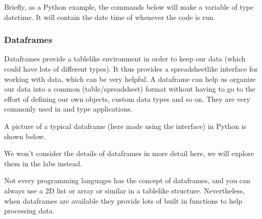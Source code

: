 \documentclass[letterpaper,10pt,british]{sphinxmanual}
\let\sphinxpxdimen\pdfpxdimen\else\newdimen\sphinxpxdimen
\begin{document}
\sphinxAtStartPar
Briefly, as a Python example, the commands below will make a variable  of type datetime. It will contain the date time of whenever the code is run.

\begin{sphinxVerbatim}[commandchars=\\\{\}]
  
\end{sphinxVerbatim}

\sphinxstepscope


\subsubsection{Dataframes}
\label{\detokenize{chapters/programming_fundamentals/dataframes:dataframes}}\label{\detokenize{chapters/programming_fundamentals/dataframes::doc}}
\sphinxAtStartPar
Dataframes provide a table\sphinxhyphen{}like environment in order to keep our data (which could have lots of different types). It thus provides a spreadsheet\sphinxhyphen{}like interface for working with data, which can be very helpful. A dataframe can help us organize our data into a common (table/spreadsheet) format without having to go to the effort of defining our own objects, custom data types and so on. They are very commonly used in  and  type applications.

\sphinxAtStartPar
A picture of a typical dataframe (here made using the  interface) in Python is shown below.

\begin{figure}[htbp]
\centering

\noindent\sphinxincludegraphics[width=800\sphinxpxdimen]{{dataframe_example}.png}
\end{figure}

\sphinxAtStartPar
We won’t consider the details of dataframes in more detail here, we will explore them in the labs instead.

\sphinxAtStartPar
Not every programming languages has the concept of dataframes, and you can always use a 2D list or array or similar in a table\sphinxhyphen{}like structure. Nevertheless, when dataframes are available they provide lots of built in functions to help processing data.
\end{document}
